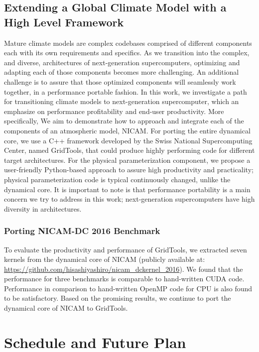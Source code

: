 \documentclass{book}
\begin{document}
\subsection{Extending a Global Climate Model with a High Level Framework}
Mature climate models are complex codebases comprised of different components each with its own requirements and specifics. As we transition into the complex, and diverse, architectures of next-generation supercomputers, optimizing and adapting each of those components becomes more challenging. An additional challenge is to assure that those optimized components will seamlessly work together, in a performance portable fashion. In this work, we investigate a path for transitioning climate models to next-generation supercomputer, which an emphasize on performance profitability and end-user productivity. More specifically, We aim to demonstrate how to approach and integrate each of the components of an atmospheric model, NICAM. For porting the entire dynamical core, we use a C++ framework developed by the Swiss National Supercomputing Center, named GridTools, that could produce highly performing code for different target architectures. For the physical parameterization component, we propose a user-friendly Python-based approach to assure high productivity and practicality; physical parameterization code is typical continuously changed, unlike the dynamical core. It is important to note is that performance portability is a main concern we try to address in this work; next-generation supercomputers have high diversity in architectures. 

\subsubsection{Porting NICAM-DC 2016 Benchmark}
To evaluate the productivity and performance of GridTools, we extracted seven kernels from the dynamical core of NICAM (publicly available at: \url{https://github.com/hisashiyashiro/nicam_dckernel_2016}). We found that the performance for three benchmarks is comparable to hand-written CUDA code. Performance in comparison to hand-written OpenMP code for CPU is also found to be satisfactory. Based on the promising results, we continue to port the dynamical core of NICAM to GridTools.


\section{Schedule and Future Plan}
\end{document}

